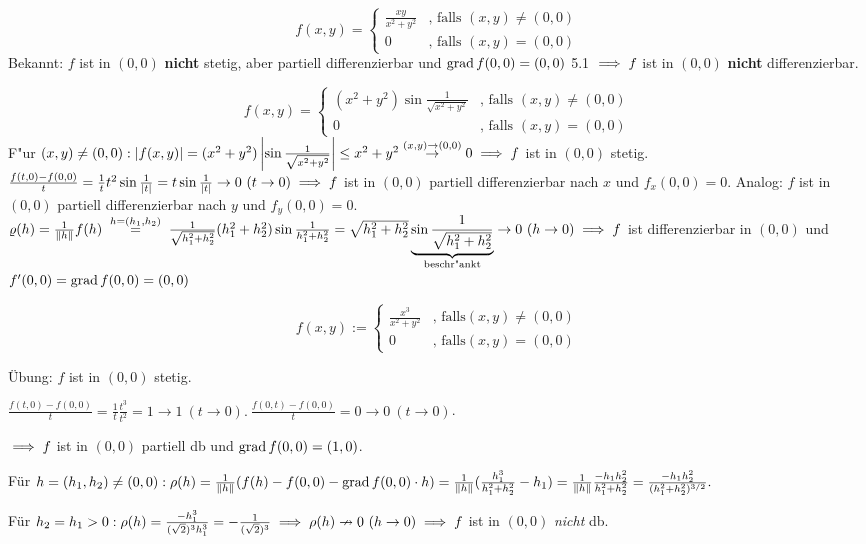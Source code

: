 \documentclass[a4paper,twoside,DIV15,BCOR12mm,chapterprefix=true,headings=twolinechapter]{scrbook}
\begin{document}
\begin{beispiele}
\item $$f(x,y)=\begin{cases}
\frac{xy}{x^2+y^2}&\text{, falls } (x,y)\ne(0,0)\\
0&\text{, falls } (x,y)=(0,0)
\end{cases}$$
Bekannt: $f$ ist in $(0,0)$ \textbf{nicht} stetig, aber partiell differenzierbar und $\mathop{\rm grad}\nolimits f(0,0)=(0,0)$ 5.1 $\implies f$ ist in $(0,0)$ \textbf{nicht} differenzierbar.
\item $$f(x,y)=\begin{cases}
(x^2+y^2)\sin\frac{1}{\sqrt{x^2+y^2}}&\text{, falls } (x,y)\ne(0,0)\\
0&\text{, falls }(x,y)=(0,0)
\end{cases}$$
F"ur $(x,y)\ne(0,0): \left|f(x,y)\right|=(x^2+y^2)\left|\sin\frac{1}{\sqrt{x^2+y^2}}\right|
\le x^2+y^2\overset{(x,y)\to(0,0)}{\to}0 \implies f$ ist in $(0,0)$ stetig. 
$\frac{f(t,0)-f(0,0)}{t}=\frac{1}{t}t^2\sin\frac{1}{|t|}=t\sin\frac{1}{|t|}\to 0\ (t\to 0)\implies f$ ist in $(0,0)$ partiell differenzierbar nach $x$ und $f_x(0,0)=0$. Analog: $f$ ist in $(0,0)$ partiell differenzierbar nach $y$ und $f_y(0,0)=0$. $\varrho(h)=\frac{1}{\|h\|}f(h)\gleichwegen{h=(h_1,h_2)}\frac{1}{\sqrt{h_1^2+h_2^2}}(h_1^2+h_2^2)\sin\frac{1}{h_1^2+h_2^2}=\sqrt{h_1^2+h_2^2}\underbrace{\sin\frac{1}{\sqrt{h_1^2+h_2^2}}}_{\text{beschr"ankt}}\to 0\ (h\to 0)\folgt f$ ist differenzierbar in $(0,0)$ und $f'(0,0)=\mathop{\rm grad}\nolimits f(0,0)=(0,0)$

\item $$f(x,y) := \begin{cases}
\frac{x^3}{x^2+y^2}&\text{, falls} (x,y) \ne (0,0)\\
0&\text{, falls} (x,y) = (0,0)\end{cases}$$

\"Ubung: $f$ ist in $(0,0)$ stetig.

$\frac{f(t,0) - f(0,0)}{t} = \frac{1}{t} \frac{t^3}{t^2} = 1 \to 1\ (t \to 0).\ \frac{f(0,t) - f(0,0)}{t} = 0 \to 0\ (t \to 0)$.

$\implies f$ ist in $(0,0)$ partiell db und $\mathop{\rm grad}\nolimits f(0,0) = (1,0)$.

Für $h = (h_1,h_2) \ne (0,0): \rho(h) = \frac{1}{\|h\|}(f(h) - f(0,0) - \mathop{\rm grad}\nolimits f(0,0)\cdot h) = \frac{1}{\|h\|} (\frac{h_1^3}{h_1^2+h_2^2} - h_1) = \frac{1}{\|h\|} \frac{-h_1 h_2^2}{h_1^2 + h_2^2} =  \frac{-h_1 h_2^2}{(h_1^2 + h_2^2)^{3/2}}.$

Für $h_2 = h_1 > 0: \rho(h) = \frac{-h_1^3}{(\sqrt{2})^3 h_1^3} = - \frac{1}{(\sqrt{2})^3} \implies \rho(h) \nrightarrow 0\ (h \to 0) \implies f$ ist in $(0,0)$ \emph{nicht} db.
\end{beispiele}
\end{document}
